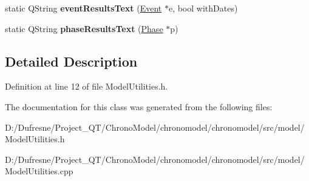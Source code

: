 \begin{DoxyCompactItemize}
\item 
\hypertarget{class_model_utilities_aebbee0a90e3b908606c18a94116a88f5}{static Q\-String {\bfseries event\-Results\-Text} (\hyperlink{class_event}{Event} $\ast$e, bool with\-Dates)}\label{class_model_utilities_aebbee0a90e3b908606c18a94116a88f5}

\item 
\hypertarget{class_model_utilities_ad905da423cbc9246b4247e6c3d172023}{static Q\-String {\bfseries phase\-Results\-Text} (\hyperlink{class_phase}{Phase} $\ast$p)}\label{class_model_utilities_ad905da423cbc9246b4247e6c3d172023}

\end{DoxyCompactItemize}


\subsection{Detailed Description}


Definition at line 12 of file Model\-Utilities.\-h.



The documentation for this class was generated from the following files\-:\begin{DoxyCompactItemize}
\item 
D\-:/\-Dufresne/\-Project\-\_\-\-Q\-T/\-Chrono\-Model/chronomodel/chronomodel/src/model/Model\-Utilities.\-h\item 
D\-:/\-Dufresne/\-Project\-\_\-\-Q\-T/\-Chrono\-Model/chronomodel/chronomodel/src/model/Model\-Utilities.\-cpp\end{DoxyCompactItemize}
